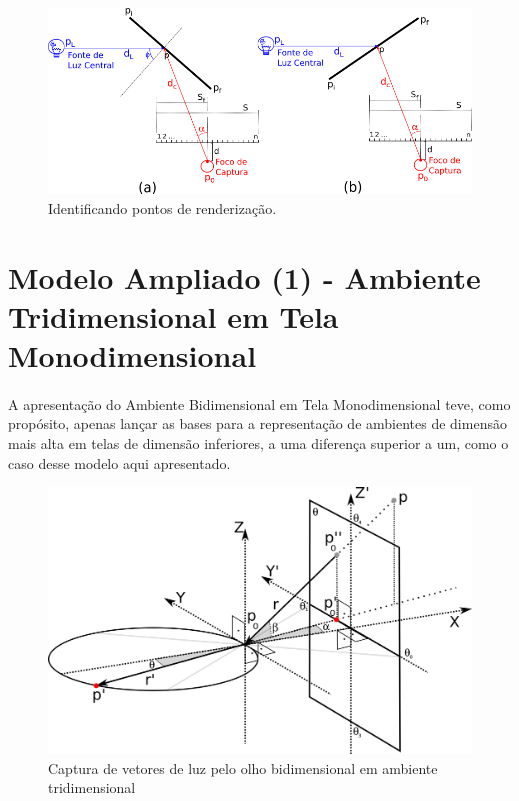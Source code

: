 \documentclass{article}
\begin{document}
	\paragraph{}
	\begin{figure}[h]
		\centering
		\includegraphics[scale=0.7]{radiosity-radial}
		\caption{Identificando pontos de renderização.}
		\label{fig:radio-rad}
	\end{figure}

	\section{Modelo Ampliado (1) - Ambiente Tridimensional em Tela Monodimensional}
	
	\paragraph{}
	A apresentação do Ambiente Bidimensional em Tela Monodimensional teve, como propósito, apenas lançar as bases para a representação de ambientes de dimensão mais alta em telas de dimensão inferiores, a uma diferença superior a um, como o caso desse modelo aqui apresentado.
	
	\begin{figure}
		\centering
		\includegraphics[scale=0.6]{Olho-Bidi-Detalhe}
		\caption{Captura de vetores de luz pelo olho bidimensional em ambiente tridimensional}
		\label{fig:olho-bidi}
	\end{figure}
\end{document}
